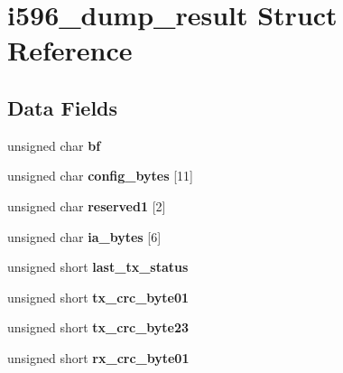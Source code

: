 \hypertarget{structi596__dump__result}{}\section{i596\+\_\+dump\+\_\+result Struct Reference}
\label{structi596__dump__result}
\subsection*{Data Fields}
\begin{DoxyCompactItemize}
\item 
\mbox{\label{structi596__dump__result_a6336c8541409215cbd6550dd97b3142b}} 
unsigned char {\bfseries bf}
\item 
\mbox{\label{structi596__dump__result_af6cac0e5954f1d5e760c1170933293e3}} 
unsigned char {\bfseries config\+\_\+bytes} \mbox{[}11\mbox{]}
\item 
\mbox{\label{structi596__dump__result_aa83a468998a532ff920a121b29fd8786}} 
unsigned char {\bfseries reserved1} \mbox{[}2\mbox{]}
\item 
\mbox{\label{structi596__dump__result_a7609721f47e3be21db5c3c43a91c6abd}} 
unsigned char {\bfseries ia\+\_\+bytes} \mbox{[}6\mbox{]}
\item 
\mbox{\label{structi596__dump__result_aee508b338ef3c22e020e5f00867b83b2}} 
unsigned short {\bfseries last\+\_\+tx\+\_\+status}
\item 
\mbox{\label{structi596__dump__result_af7dc442697296e73afc8bc43f9afab10}} 
unsigned short {\bfseries tx\+\_\+crc\+\_\+byte01}
\item 
\mbox{\label{structi596__dump__result_a5151d7b0748cf7e24fdff5b680c1dec3}} 
unsigned short {\bfseries tx\+\_\+crc\+\_\+byte23}
\item 
\mbox{\label{structi596__dump__result_a29b65f2d6338240709ad3946da8bf18c}} 
unsigned short {\bfseries rx\+\_\+crc\+\_\+byte01}
\item 
\mbox{\label{structi596__dump__result_a9b84e71c09b8c08091616b5a6bc495d2}} 

\end{DoxyCompactItemize}
